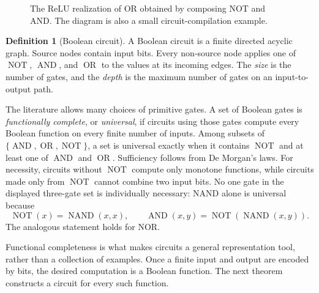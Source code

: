 \documentclass[11pt,twoside]{article}
\newcommand{\NOT}{\operatorname{NOT}}
\newcommand{\AND}{\operatorname{AND}}
\newcommand{\OR}{\operatorname{OR}}
\theoremstyle{definition}
\newtheorem{definition}[theorem]{Definition}
\theoremstyle{remark}
\begin{document}
\begin{figure}[ht]
\centering
{}
\caption{The ReLU realization of OR obtained by composing NOT and AND. The
diagram is also a small circuit-compilation example.}
\label{fig:or-composition}
\end{figure}

\begin{definition}[Boolean circuit]
A Boolean circuit is a finite directed acyclic graph. Source nodes contain
input bits. Every non-source node applies one of $\NOT$, $\AND$, and $\OR$ to
the values at its incoming edges. The \emph{size} is the number of gates, and
the \emph{depth} is the maximum number of gates on an input-to-output path.
\end{definition}

The literature allows many choices of primitive gates. A set of Boolean
gates is \emph{functionally complete}, or \emph{universal}, if circuits using
those gates compute every Boolean function on every finite number of inputs.
Among subsets of $\{\AND,\OR,\NOT\}$, a set is universal exactly when it
contains $\NOT$ and at least one of $\AND$ and $\OR$. Sufficiency follows
from De Morgan's laws. For necessity, circuits without $\NOT$ compute only
monotone functions, while circuits made only from $\NOT$ cannot combine two
input bits. No one gate in the displayed three-gate set is individually
necessary: NAND alone is universal because
\[
 \NOT(x)=\operatorname{NAND}(x,x),
 \qquad
 \AND(x,y)=\NOT(\operatorname{NAND}(x,y)).
\]
The analogous statement holds for NOR.

Functional completeness is what makes circuits a general representation
tool, rather than a collection of examples. Once a finite input and output
are encoded by bits, the desired computation is a Boolean function. The next
theorem constructs a circuit for every such function.
\end{document}
